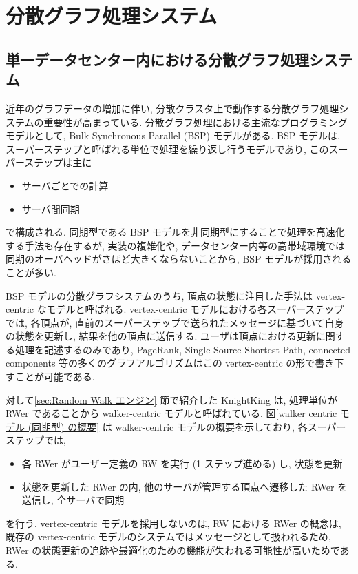 \section{分散グラフ処理システム}

\subsection{単一データセンター内における分散グラフ処理システム}\label{sec:分散グラフ処理システム}

近年のグラフデータの増加に伴い, 分散クラスタ上で動作する分散グラフ処理システムの重要性が高まっている. 分散グラフ処理における主流なプログラミングモデルとして, Bulk Synchronous Parallel (BSP) モデルがある. BSP モデルは, スーパーステップと呼ばれる単位で処理を繰り返し行うモデルであり, このスーパーステップは主に
\begin{itemize}
    \item サーバごとでの計算
    \item サーバ間同期
\end{itemize}
で構成される. 同期型である BSP モデルを非同期型にすることで処理を高速化する手法も存在する\cite{BAP}\cite{AAP}\cite{Gluon-Async}が, 実装の複雑化や, データセンター内等の高帯域環境では同期のオーバヘッドがさほど大きくならないことから, BSP モデルが採用されることが多い. 

BSP モデルの分散グラフシステムのうち, 頂点の状態に注目した手法\cite{Pregel}\cite{10.1145/2741948.2741970}\cite{10.5555/2387880.2387883}\cite{10.5555/3026877.3026901}\cite{Gluon}は vertex-centric なモデルと呼ばれる. vertex-centric モデルにおける各スーパーステップでは, 各頂点が, 直前のスーパーステップで送られたメッセージに基づいて自身の状態を更新し, 結果を他の頂点に送信する. ユーザは頂点における更新に関する処理を記述するのみであり, PageRank, Single Source Shortest Path, connected components 等の多くのグラフアルゴリズムはこの vertex-centric の形で書き下すことが可能である. 

対して\ref{sec:Random Walk エンジン} 節で紹介した KnightKing は, 処理単位が RWer であることから walker-centric モデルと呼ばれている. 図\ref{walker centric モデル (同期型) の概要} は walker-centric モデルの概要を示しており, 各スーパーステップでは, 
\begin{itemize}
    \item 各 RWer がユーザー定義の RW を実行 (1 ステップ進める) し, 状態を更新
    \item 状態を更新した RWer の内, 他のサーバが管理する頂点へ遷移した RWer を送信し, 全サーバで同期
\end{itemize}
を行う. vertex-centric モデルを採用しないのは, RW における RWer の概念は, 既存の vertex-centric モデルのシステムではメッセージとして扱われるため, RWer の状態更新の追跡や最適化のための機能が失われる可能性が高いためである. 

